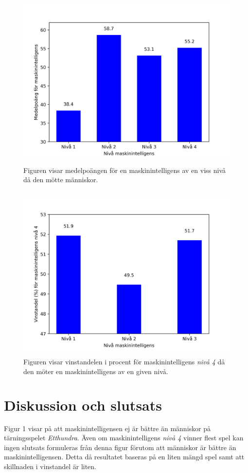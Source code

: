 \documentclass[12pt,a4paper]{article}
\begin{document}
    \begin{figure}[H] 
      \centering
      \includegraphics[height=3.5in]{./images/medelpoang_maskinintelligens.png}
      \caption{Figuren visar medelpoängen för en maskinintelligens av en viss nivå då den mötte människor.}
      \label{fig:medelpoangmaskinintelligens}
    \end{figure}

    \begin{figure}[H] \centering
      \includegraphics[height=3.5in]{./images/vinstandel_niva4.png}
      \caption{Figuren visar vinstandelen i procent för maskinintelligens
      \emph{nivå 4} då den möter en maskinintelligens av en given nivå.}
      \label{fig:vinstandelniva4} 
    \end{figure}

  \section{Diskussion och slutsats}\label{sec:diskussionochslutsats} 
    Figur 1 visar på att maskinintelligensen ej är bättre än människor på tärningsspelet \emph{Etthundra}. Även om maskinintelligens \emph{nivå 4} vinner flest spel kan ingen slutsats formuleras från denna figur förutom att människor är bättre än maskinintelligensen. Detta då resultatet baseras på en liten mängd spel samt att skillnaden i vinstandel är liten. 
  
\end{document}
